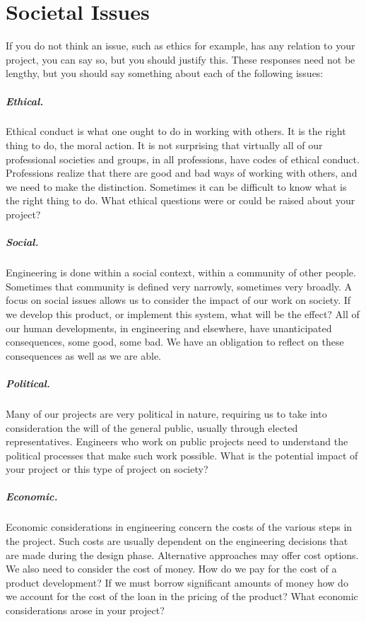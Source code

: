 \chapter{Societal Issues}\label{ch:societal_issues}

If you do not think an issue, such as ethics for example, has any relation to your project, you can say so, but you should justify this. These responses need not be lengthy, but you should say something about each of the following issues:

\paragraph{Ethical.}
Ethical conduct is what one ought to do in working with others. It is the right thing to do, the moral action. It is not surprising that virtually all of our professional societies and groups, in all professions, have codes of ethical conduct. Professions realize that there are good and bad ways of working with others, and we need to make the distinction. Sometimes it can be difficult to know what is the right thing to do. What ethical questions were or could be raised about your project?

\paragraph{Social.}
Engineering is done within a social context, within a community of other people. Sometimes that community is defined very narrowly, sometimes very broadly. A focus on social issues allows us to consider the impact of our work on society. If we develop this product, or implement this system, what will be the effect? All of our human developments, in engineering and elsewhere, have unanticipated consequences, some good, some bad. We have an obligation to reflect on these consequences as well as we are able.

\paragraph{Political.}
Many of our projects are very political in nature, requiring us to take into consideration the will of the general public, usually through elected representatives. Engineers who work on public projects need to understand the political processes that make such work possible. What is the potential impact of your project or this type of project on society?

\paragraph{Economic.}
Economic considerations in engineering concern the costs of the various steps in the project. Such costs are usually dependent on the engineering decisions that are made during the design phase. Alternative approaches may offer cost options. We also need to consider the cost of money. How do we pay for the cost of a product development? If we must borrow significant amounts of money how do we account for the cost of the loan in the pricing of the product? What economic considerations arose in your project?

